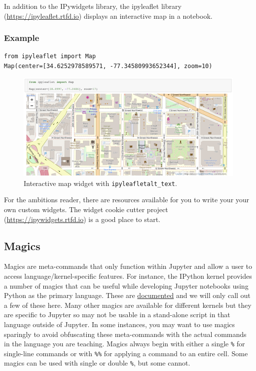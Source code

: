 \documentclass[]{book}
\begin{document}
In addition to the IPywidgets library, the ipyleaflet library
(\url{https://ipyleaflet.rtfd.io}) displays an interactive map in a
notebook.

\subsubsection*{Example}\label{example}

\begin{verbatim}
from ipyleaflet import Map
Map(center=[34.6252978589571, -77.34580993652344], zoom=10)
\end{verbatim}

\begin{figure}
\centering
\includegraphics{images/chapter52.png}
\caption{Interactive map widget with \texttt{ipyleafletalt\_text}.}
\end{figure}

For the ambitions reader, there are resources available for you to write
your your own custom widgets. The widget cookie cutter project
(\url{https://ipywidgets.rtfd.io}) is a good place to start.

\subsection{Magics}\label{magics}

Magics are meta-commands that only function within Jupyter and allow a
user to access language/kernel-specific features. For instance, the
IPython kernel provides a number of magics that can be useful while
developing Jupyter notebooks using Python as the primary language. These
are
\href{https://ipython.readthedocs.io/en/stable/interactive/magics.html}{documented}
and we will only call out a few of these here. Many other magics are
available for different kernels but they are specific to Jupyter so may
not be usable in a stand-alone script in that language outside of
Jupyter. In some instances, you may want to use magics sparingly to
avoid obfuscating these meta-commands with the actual commands in the
language you are teaching. Magics always begin with either a single
\texttt{\%} for single-line commands or with \texttt{\%\%} for applying
a command to an entire cell. Some magics can be used with single or
double \texttt{\%}, but some cannot.
\end{document}

